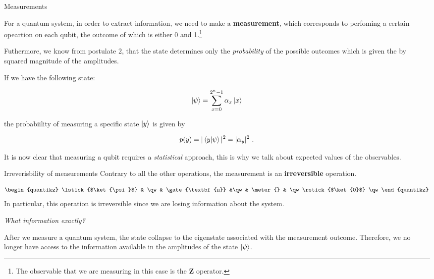 \documentclass[11p,aspectratio=169]{beamer}
\begin{document}
\begin{frame}{Measurements}

    For a quantum system, in order to extract information, we need to make a \textbf{measurement}, which corresponds
    to perfoming a certain opeartion on each qubit, the outcome of which is either 0 and 1.\footnote{
        The observable that we are measuring in this case is the $\textbf{Z}$ operator.
    }

    Futhermore, we know from postulate 2, that the state determines only the \emph{probability} of the
    possible outcomes which is given the by squared magnitude of the amplitudes.

    If we have the following state:

    $$ \ket{\psi} = \sum_{x = 0}^{2^n - 1} \alpha_x \ket{x} $$

    the probabiility of measuring a specific state $\ket{y}$ is given by

    $$ p (y) = |\bra{y} \ket{\psi} |^2 = |\alpha_y|^2 \ .$$

    It is now clear that measuring a qubit requires a \emph{statistical} approach, this is why we talk 
    about expected values of the observables.

\end{frame}

\begin{frame}{Irreverisbility of measurements}
    Contrary to all the other operations, the measurement is an \textbf{irreversible} operation.

    $$
    \begin{quantikz}
        \lstick{$\ket{\psi}$} & \qw & \gate{\textbf{u}} &\qw
        & \meter{} & \qw \rstick{$\ket{0}$} \qw
        \end{quantikz}
        $$
    In particular, this operation is irreversible since we are losing information about the system.
    
    \emph{What information exactly?}

    \pause

    After we measure a quantum system, the state collapse to the eigenstate associated with the measurement
    outcome. Therefore, we no longer have access to the information available in the amplitudes of the 
    state $\ket{\psi}$.
    
\end{frame}
\end{document}
